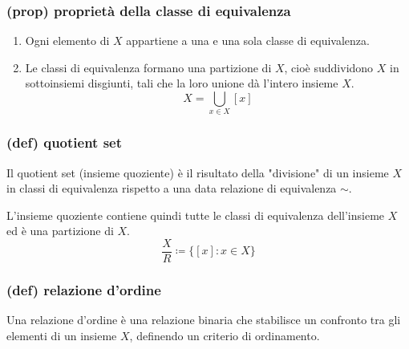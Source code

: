 \subsubsection{(prop) proprietà della classe di equivalenza}
\begin{enumerate}
    \item Ogni elemento di $X$ appartiene a una e una sola classe di equivalenza.
    \item Le classi di equivalenza formano una partizione di $X$, cioè suddividono $X$ in sottoinsiemi disgiunti, tali che la loro unione dà l'intero insieme $X$.
    $$X=\bigcup_{x\in X}[x]$$
\end{enumerate}
\subsubsection{(def) quotient set}
Il quotient set (insieme quoziente) è il risultato della "divisione" di un insieme $X$ in classi di equivalenza rispetto a una data relazione di equivalenza $\sim$.

L'insieme quoziente contiene quindi tutte le classi di equivalenza dell'insieme $X$ ed è una partizione di $X$.
$$\frac X R\coloneqq\{ [x]:x\in X\}$$
\subsubsection{(def) relazione d'ordine}
Una relazione d'ordine è una relazione binaria che stabilisce un confronto tra gli elementi di un insieme $X$, definendo un criterio di ordinamento.

